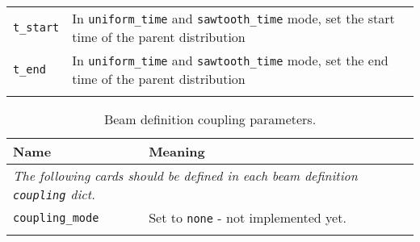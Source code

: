 \begin{table*}
\begin{center}
\begin{tabularx}{\linewidth}{lX}
\hline
\verb|t_start| & In \verb|uniform_time| and \verb|sawtooth_time| mode, set the start time of the parent distribution \\
\verb|t_end| & In \verb|uniform_time| and \verb|sawtooth_time| mode, set the end time of the parent distribution \\
\begin{makeimage} %
\end{makeimage} 
\end{tabularx}
\end{center}
\end{table*}

\begin{table*}
\begin{center}
\caption{Beam definition coupling parameters.}
\begin{tabularx}{\linewidth}{lX}
Name & Meaning \\
\hline
\multicolumn{2}{l}{\emph{The following cards should be defined in each beam definition \verb|coupling| dict.}} \\
\hline
\verb|coupling_mode| & Set to \verb|none| - not implemented yet. \\
\begin{makeimage} %
\end{makeimage} 
\end{tabularx}
\end{center}
\end{table*}

